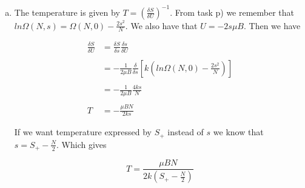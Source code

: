 \documentclass[a4paper,norsk,12pt,oneside]{article}
\begin{document}
\begin{enumerate}[a)]
    \item

        The temperature is given by \(T = \left (\frac{\delta S}{\delta U} \right)^{-1} \). 
        From 
        task p) we remember that \(ln\Omega(N,s) = \Omega(N,0) - \frac{
        2s^2}{N} \). We also have that \(U = -2s \mu B\). Then we have

        \begin{align*}
            \frac{\delta S}{\delta U} &= \frac{\delta S}{\delta s} \frac{\delta s}{\delta 
            U}\\ \\
            &= - \frac{1}{2 \mu B} \frac{\delta}{\delta s} \left [k \left ( ln\Omega(N,0)
            - \frac{2s^2}{N} \right ) \right ] \\\\
            &= -\frac{1}{2 \mu B} \frac{4ks}{N} \\\\
            T &= - \frac{\mu BN}{2ks}
        \end{align*}

        If we want temperature expressed by \(S_+\) instead of \(s\) we know that 
        \(s = S_+ - \frac{N}{2}\). Which gives

        \begin{equation*}
            T = \frac{\mu BN}{2k\left (S_+ - \frac{N}{2}\right )}
        \end{equation*}

    \end{enumerate}
\end{document}
